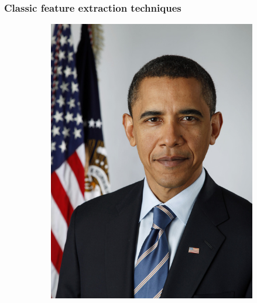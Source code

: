 \documentclass[conference]{IEEEtran}
\begin{document}
				\subsubsection{Classic feature extraction techniques}
					
					\begin{figure}[!ht]
						\centering
						\begin{subfigure}[!ht]{0.48\linewidth}
							\centerline{\includegraphics[width=0.9\linewidth]{imgs/obama.jpg}}
							\label{fig:1a}
						\end{subfigure}
						\begin{subfigure}[!ht]{0.48\linewidth}

\end{subfigure}
\end{figure}
\end{document}
